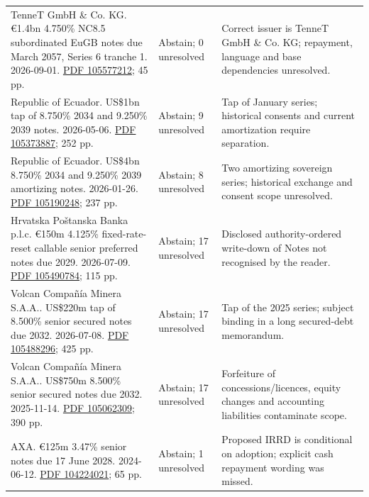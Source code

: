{\begin{longtable}{P{0.44\textwidth}P{0.12\textwidth}P{0.34\textwidth}}
TenneT GmbH \& Co. KG. €1.4bn 4.750\% NC8.5 subordinated EuGB notes due March 2057, Series 6 tranche 1. 2026-09-01. \href{../prospectus/difficulty-2026-10-04/pdfs/case-105577212.pdf}{PDF 105577212}; 45 pp. & Abstain; 0 unresolved & Correct issuer is TenneT GmbH \& Co. KG; repayment, language and base dependencies unresolved. \\

Republic of Ecuador. US\$1bn tap of 8.750\% 2034 and 9.250\% 2039 notes. 2026-05-06. \href{../prospectus/difficulty-2026-10-04/pdfs/case-105373887.pdf}{PDF 105373887}; 252 pp. & Abstain; 9 unresolved & Tap of January series; historical consents and current amortization require separation. \\

Republic of Ecuador. US\$4bn 8.750\% 2034 and 9.250\% 2039 amortizing notes. 2026-01-26. \href{../prospectus/difficulty-2026-10-04/pdfs/case-105190248.pdf}{PDF 105190248}; 237 pp. & Abstain; 8 unresolved & Two amortizing sovereign series; historical exchange and consent scope unresolved. \\

Hrvatska Poštanska Banka p.l.c. €150m 4.125\% fixed-rate-reset callable senior preferred notes due 2029. 2026-07-09. \href{../prospectus/difficulty-2026-10-04/pdfs/case-105490784.pdf}{PDF 105490784}; 115 pp. & Abstain; 17 unresolved & Disclosed authority-ordered write-down of Notes not recognised by the reader. \\

Volcan Compañía Minera S.A.A.. US\$220m tap of 8.500\% senior secured notes due 2032. 2026-07-08. \href{../prospectus/difficulty-2026-10-04/pdfs/case-105488296.pdf}{PDF 105488296}; 425 pp. & Abstain; 17 unresolved & Tap of the 2025 series; subject binding in a long secured-debt memorandum. \\

Volcan Compañía Minera S.A.A.. US\$750m 8.500\% senior secured notes due 2032. 2025-11-14. \href{../prospectus/difficulty-2026-10-04/pdfs/case-105062309.pdf}{PDF 105062309}; 390 pp. & Abstain; 17 unresolved & Forfeiture of concessions/licences, equity changes and accounting liabilities contaminate scope. \\

AXA. €125m 3.47\% senior notes due 17 June 2028. 2024-06-12. \href{../prospectus/difficulty-2026-10-04/pdfs/case-104224021.pdf}{PDF 104224021}; 65 pp. & Abstain; 1 unresolved & Proposed IRRD is conditional on adoption; explicit cash repayment wording was missed. \\
\bottomrule
\end{longtable}
}

